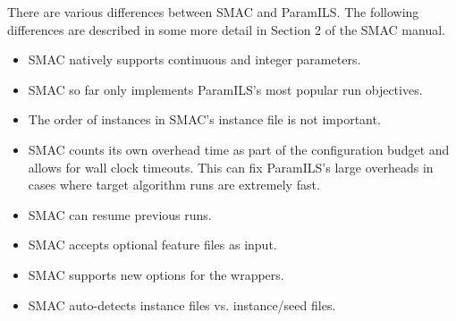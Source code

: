 \documentclass[11pt,letterpaper,twoside]{article}
\begin{document}
There are various differences between SMAC and ParamILS. The following differences are described in some more detail in Section 2 of the SMAC manual.

\begin{itemize}
\item SMAC natively supports continuous and integer parameters.
\item SMAC so far only implements ParamILS's most popular run objectives.
\item The order of instances in SMAC's instance file is not important.
\item SMAC counts its own overhead time as part of the configuration budget and allows for wall clock timeouts. This can fix ParamILS's large overheads in cases where target algorithm runs are extremely fast.
\item SMAC can resume previous runs.
\item SMAC accepts optional feature files as input.
\item SMAC supports new options for the wrappers.
\item SMAC auto-detects instance files vs. instance/seed files.
\end{itemize}
 
%

%
%

\footnotesize{
%

}
\end{document}
